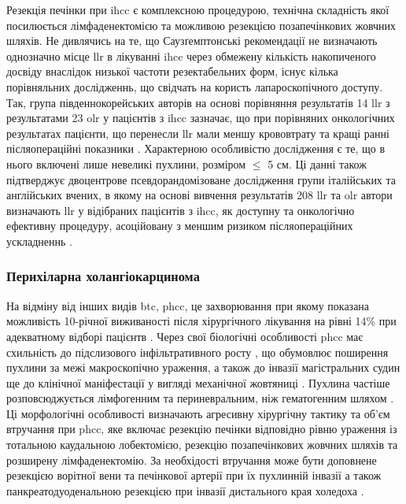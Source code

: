 Резекція печінки при \acrshort{ihcc} є комплексною процедурою, технічна складність якої посилюється лімфаденектомією та можливою резекцією позапечінкових жовчних шляхів. Не дивлячись на те, що Саузґемптонські рекомендації не визначають однозначно місце \acrshort{llr} в лікуванні \acrshort{ihcc} через обмежену кількість накопиченого досвіду внаслідок низької частоти резектабельних форм, існує кілька порівняльних дослідженнь, що свідчать на користь лапароскопічного доступу. Так, група південнокорейських авторів на основі порівняння результатів 14 \acrshort{llr} з результатами 23 \acrshort{olr} у пацієнтів з \acrshort{ihcc} зазначає, що при порівняних онкологічних результатах пацієнти, що перенесли \acrshort{llr} мали меншу крововтрату та кращі ранні післяопераційні показники \cite{Lee2016a}. Характерною особливістю дослідження є те, що в нього включені лише невеликі пухлини, розміром $\leq$ 5 см. Ці данні також підтверджує двоцентрове псевдорандомізоване дослідження групи італійських та англійських вчених, в якому на основі вивчення результатів 208 \acrshort{llr} та \acrshort{olr} автори визначають \acrshort{llr} у відібраних пацієнтів  з \acrshort{ihcc}, як доступну та онкологічно ефективну процедуру, асоційовану з меншим ризиком післяопераційних ускладненнь \cite{Ratti2020}.


\subsubsection{Перихіларна холангіокарцинома}

На відміну від інших видів \acrshort{btc}, \acrshort{phcc}, це захворювання при якому показана можливість 10-річної виживаності після хірургічного лікування на рівні 14\% при адекватному відборі пацієнтв \cite{Juntermanns2019}. Через свої біологічні особливості \acrshort{phcc} має схильність до підслизового інфільтративного росту \cite{Sakamoto1998}, що обумовлює поширення пухлини за межі макроскопічно ураження, а також до інвазії магістральних судин ще до клінічної маніфестації у вигляді механічної жовтяниці \cite{Shimada2003}. Пухлина частіше розповсюджується лімфогенним та периневральним, ніж гематогенним шляхом \cite{Zimmermann2017}. Ці морфологічні особливості визначають агресивну хірургічну тактику та об'єм  втручання при \acrshort{phcc}, яке включає резекцію печінки відповідно рівню ураження із тотальною каудальною лобектомією, резекцію позапечінкових жовчних шляхів та розширену лімфаденектомію. За необхідості втручання може бути доповнене резекцією ворітної вени та печінкової артерії при їх пухлинній інвазії а також панкреатодуоденальною резекцією при інвазії дистального края холедоха \cite{Mizuno2019}. 

